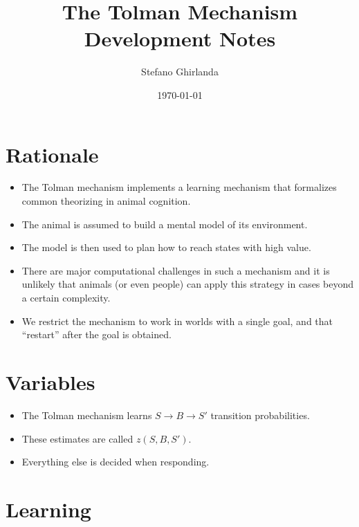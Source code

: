 \documentclass[11pt]{article}
\author{Stefano Ghirlanda}
\date{\today}
\title{The Tolman Mechanism\\\medskip
\large Development Notes}
\begin{document}
\maketitle

\section{Rationale}
\label{sec:orgd4d25c2}

\begin{itemize}
\item The Tolman mechanism implements a learning mechanism that formalizes
common theorizing in animal cognition.
\item The animal is assumed to build a mental model of its environment.
\item The model is then used to plan how to reach states with high value.
\item There are major computational challenges in such a mechanism and it
is unlikely that animals (or even people) can apply this strategy
in cases beyond a certain complexity.
\item We restrict the mechanism to work in worlds with a single goal, and
that ``restart'' after the goal is obtained.
\end{itemize}

\section{Variables}
\label{sec:org1b3a1dd}

\begin{itemize}
\item The Tolman mechanism learns \(S\to B\to S'\) transition
probabilities.
\item These estimates are called \(z(S,B,S')\).
\item Everything else is decided when responding.
\end{itemize}

\section{Learning}
\label{sec:org45913e8}
\end{document}
